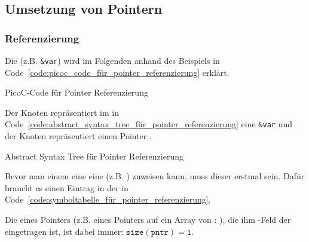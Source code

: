 
\subsection{Umsetzung von Pointern}
\subsubsection{Referenzierung}
Die  (z.B. \verb|&var|) wird im Folgenden anhand des Beispiels in Code~\ref{code:picoc_code_für_pointer_referenzierung} erklärt.

\begin{code}
  \centering
  \caption{PicoC-Code für Pointer Referenzierung}
  \label{code:picoc_code_für_pointer_referenzierung}
\end{code}

Der Knoten  repräsentiert im  in Code~\ref{code:abstract_syntax_tree_für_pointer_referenzierung} eine  \verb|&var| und der Knoten  repräsentiert einen Pointer .

\begin{code}
  \centering
  \caption{Abstract Syntax Tree für Pointer Referenzierung}
  \label{code:abstract_syntax_tree_für_pointer_referenzierung}
\end{code}

Bevor man einem  eine eine  (z.B. ) zuweisen kann, muss dieser erstmal  sein. Dafür braucht es einen Eintrag in der  in Code~\ref{code:symboltabelle_für_pointer_referenzierung}.

\begin{Special_Paragraph}
Die  eines Pointers (z.B. eines Pointers auf ein Array von : ), die ihm -Feld der  eingetragen ist, ist dabei immer: $\mathtt{size(pntr) = 1}$.
\end{Special_Paragraph}

